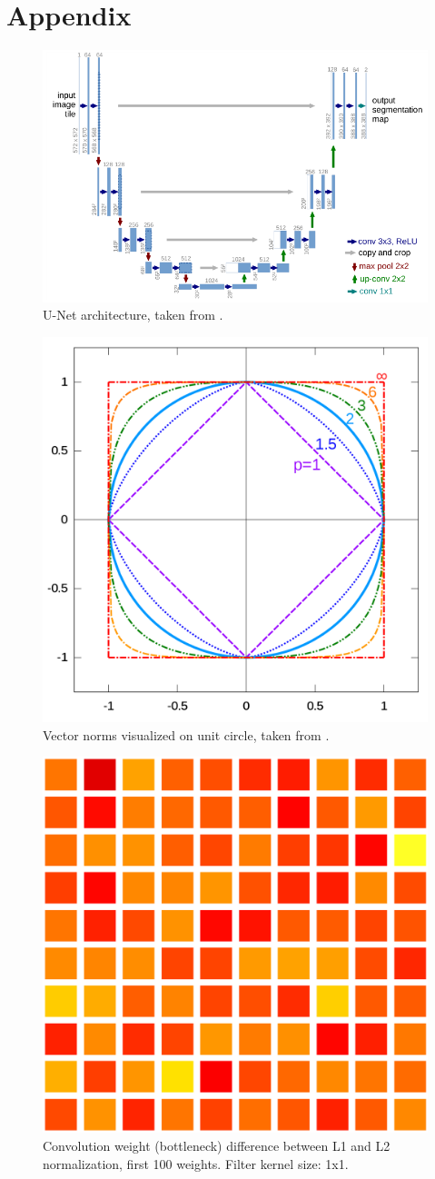 \documentclass[acmtog]{techreportacmart}
\begin{document}
\newpage



\newpage
\section{Appendix}

\begin{figure}[H]
  \includegraphics[width=.4\textwidth]{figures/U-Net_classic}
  \caption{U-Net architecture, taken from \cite{ronneberger2015}.}
  \label{fig:two}
\end{figure}

\begin{figure}[H]
  \includegraphics[width=.3\textwidth]{figures/norms}
  \caption{Vector norms visualized on unit circle, taken from \cite{norms_pic}.}
  \label{fig:three}
\end{figure}


\begin{figure}[H]
  \includegraphics[width=.3\textwidth]{figures/weights_visualized/diff_bottleneck_conv.png}
  \caption{Convolution weight (bottleneck) difference between L1 and L2 normalization, first 100 weights. Filter kernel size: 1x1.}
  \label{fig:four}
\end{figure}

\end{document}
